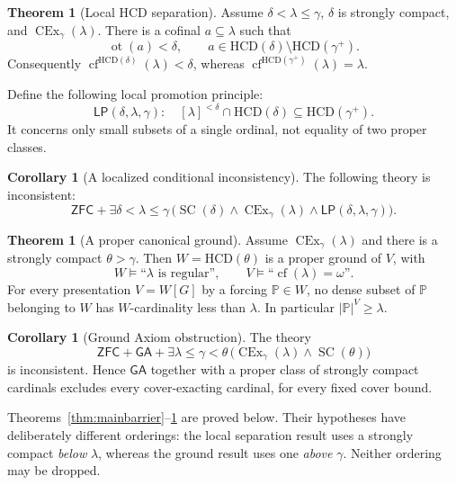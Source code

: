\documentclass[11pt,letterpaper]{article}
\theoremstyle{definition}
\newtheorem{theorem}[definition]{Theorem}
\newtheorem{corollary}[definition]{Corollary}
\newcommand{\ZFC}{\mathsf{ZFC}}
\newcommand{\SC}{\operatorname{SC}}
\newcommand{\CEx}{\operatorname{CEx}}
\newcommand{\cf}{\operatorname{cf}}
\newcommand{\ot}{\operatorname{ot}}
\newcommand{\HCD}{\mathrm{HCD}}
\newcommand{\GA}{\mathsf{GA}}
\newcommand{\LP}{\mathsf{LP}}
\numberwithin{equation}{section}
\begin{document}
\begin{theorem}[Local HCD separation]\label{thm:mainseparation}
Assume $\delta<\lambda\leq\gamma$, $\delta$ is strongly compact, and $\CEx_\gamma(\lambda)$. There is a cofinal $a\subseteq\lambda$ such that
\begin{equation}\label{eq:witness}
 \ot(a)<\delta,
 \qquad a\in\HCD(\delta)\setminus\HCD(\gamma^+).
\end{equation}
Consequently $\cf^{\HCD(\delta)}(\lambda)<\delta$, whereas
$\cf^{\HCD(\gamma^+)}(\lambda)=\lambda$.
\end{theorem}

Define the following local promotion principle:
\begin{equation}\label{eq:LP}
 \LP(\delta,\lambda,\gamma):\quad
 [\lambda]^{<\delta}\cap\HCD(\delta)
       \subseteq\HCD(\gamma^+).
\end{equation}
It concerns only small subsets of a single ordinal, not equality of two proper classes.

\begin{corollary}[A localized conditional inconsistency]\label{cor:local-inconsistent}
The following theory is inconsistent:
\[
 \ZFC+\exists\delta<\lambda\leq\gamma\,
 \bigl(\SC(\delta)\wedge\CEx_\gamma(\lambda)
                  \wedge\LP(\delta,\lambda,\gamma)\bigr).
\]
\end{corollary}

\begin{theorem}[A proper canonical ground]\label{thm:mainground}
Assume $\CEx_\gamma(\lambda)$ and there is a strongly compact $\theta>\gamma$. Then $W=\HCD(\theta)$ is a proper ground of $V$, with
\[
 W\models\text{``$\lambda$ is regular''},\qquad
 V\models\text{``$\cf(\lambda)=\omega$''}.
\]
For every presentation $V=W[G]$ by a forcing $\mathbb P\in W$, no dense subset of $\mathbb P$ belonging to $W$ has $W$-cardinality less than $\lambda$. In particular $|\mathbb P|^V\geq\lambda$.
\end{theorem}

\begin{corollary}[Ground Axiom obstruction]\label{cor:GA}
The theory
\[
 \ZFC+\GA+\exists\lambda\leq\gamma<\theta\,
       \bigl(\CEx_\gamma(\lambda)\wedge\SC(\theta)\bigr)
\]
is inconsistent. Hence $\GA$ together with a proper class of strongly compact cardinals excludes every cover-exacting cardinal, for every fixed cover bound.
\end{corollary}

Theorems~\ref{thm:mainbarrier}--\ref{thm:mainground} are proved below. Their hypotheses have deliberately different orderings: the local separation result uses a strongly compact \emph{below} $\lambda$, whereas the ground result uses one \emph{above} $\gamma$. Neither ordering may be dropped.
\end{document}
